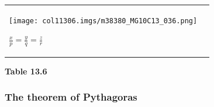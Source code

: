 \begin{table}[H]
\begin{center}
\begin{xtabular*}{\mytablewidth}[t]{|p{10\mystarwidth}|p{10\mystarwidth}|}
    
        
                    
    \setcounter{subfigure}{0}

\label{m38380*id318279}
    \begin{center}
   
\label{m38380*id318279!!!underscore!!!media}\label{
m38380*id318279!!!underscore!!!printimage}\texttt{[image: col11306.imgs/m38380\_MG10C13\_036.png]} %
        
      \vspace{2pt}
    \vspace{.1in}
    
    \end{center}



    \addtocounter{footnote}{-0}
    
                    \begin{math}\frac{x}{p}=\frac{y}{q}=\frac{z}{r}\end{math}
     \tabularnewline{}
    \end{xtabular*}
      \end{center}
    \begin{center}{\small\bfseries Table 13.6}\end{center}
    
    \addtocounter{footnote}{-0}
    
    \par
  
        
        \label{m38380*uid49}
        \subsubsection{ The theorem of Pythagoras}
        \nopagebreak
        
          
          \label{m38380*id318328}
    \setcounter{subfigure}{0}


	\begin{figure}[H] %
    \begin{center}
   

\end{center}
\end{figure}
\end{table}
